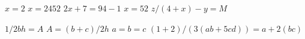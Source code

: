\documentclass{article}
\begin{document}
$x = 2$
$x=2452$ 
$2x + 7 = 94 - 1$ 
$x = 52$ 
$z/(4 + x) - y = M$

$1/2bh = A$
$A = (b+c)/2h$
$a=b=c$
$(1+2)/(3(ab+5cd))=a+2(bc)$
\end{document}
